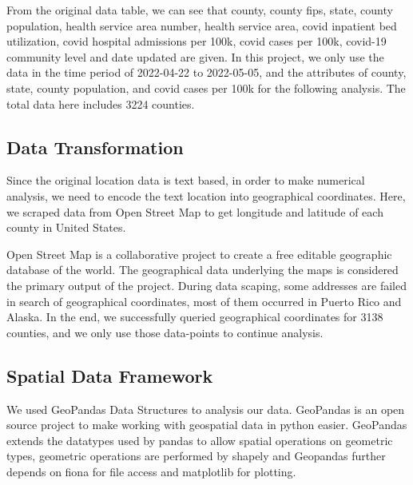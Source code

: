 \documentclass{article}
\begin{document}
From the original data table, we can see that county, county fips, state, county population, health service area number, health service area, covid inpatient bed utilization, covid hospital admissions per 100k, covid cases per 100k, covid-19 community level and date updated are given. In this project, we only use the data in the time period of 2022-04-22 to 2022-05-05, and the attributes of county, state, county population,
and covid cases per 100k for the following analysis. The total data here includes 3224 counties.

\subsection{Data Transformation}
Since the original location data is text based, in order to make numerical analysis, we need to encode the text location into geographical coordinates. Here, we scraped data from Open Street Map to get longitude and latitude of each county in United States\cite{haklay2008openstreetmap}.

Open Street Map is a collaborative project to create a free editable geographic database of the world. The geographical data underlying the maps is considered the primary output of the project. During data scaping, some addresses are failed in search of geographical coordinates, most of them occurred in Puerto Rico and Alaska. In the end, we successfully queried geographical coordinates for 3138 counties, and we only use those data-points to continue analysis.

\subsection{Spatial Data Framework}
We used GeoPandas Data Structures to analysis our data. GeoPandas is an open source project to make working with geospatial data in python easier\cite{jordahl2014geopandas}. GeoPandas extends the datatypes used by pandas to allow spatial operations on geometric types, geometric operations are performed by shapely and Geopandas further depends on fiona for file access and matplotlib for plotting.
\end{document}
